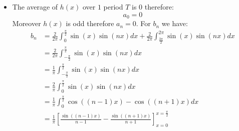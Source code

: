 \documentclass[11pt]{article}
\begin{document}
\begin{solution}
\begin{itemize}
    \item 
    The average of $h(x)$ over $1$ period $T$ is $0$ therefore:
    \[
        a_0 = 0
    \]
    Moreover $h(x)$ is odd therefore $a_n = 0$. For $b_n$ we have:
    \begin{align*}
        b_n 
        &
        = 
        \frac{2}{2\pi}
        \int_{0}^{\frac{\pi}{2}} \sin(x) \sin(n x) dx
        +
        \frac{2}{2\pi}
        \int_{\frac{3\pi}{2}}^{2\pi} \sin(x) \sin(n x) dx
        \\&
        =
        \frac{2}{2\pi}
        \int_{-\frac{\pi}{2}}^{\frac{\pi}{2}} \sin(x) \sin(n x) dx
        \\&
        =
        \frac{1}{\pi}
        \int_{-\frac{\pi}{2}}^{\frac{\pi}{2}} \sin(x) \sin(n x) dx
        \\&
        =
        \frac{2}{\pi}
        \int_{0}^{\frac{\pi}{2}} \sin(x) \sin(n x) dx
        \\&
        =
        \frac{1}{\pi}
        \int_{0}^{\frac{\pi}{2}} \cos((n-1)x) - \cos((n+1)x) dx
        \\&
        =
        \frac{1}{\pi}
        \left[ \frac{\sin((n-1)x)}{n-1} - \frac{\sin((n+1)x)}{n+1}\right]_{x=0}^{x=\frac{\pi}{2}}
        \\&

\end{align*}
\end{itemize}
\end{solution}
\end{document}

